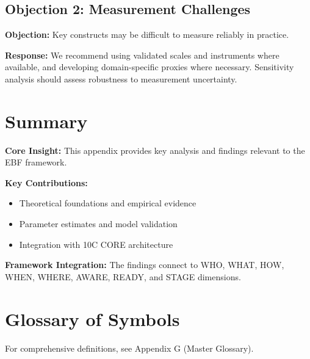 \subsection{Objection 2: Measurement Challenges}

\textbf{Objection:} Key constructs may be difficult to measure reliably in
practice.

\textbf{Response:} We recommend using validated scales and instruments where
available, and developing domain-specific proxies where necessary. Sensitivity
analysis should assess robustness to measurement uncertainty.





\section{Summary}
\label{sec:llm-summary}

\begin{tcolorbox}[colback=gray!5!white, colframe=gray!75!black,
    title=Appendix UNMAPPED_LLM Summary]

\textbf{Core Insight:}
This appendix provides key analysis and findings relevant to the EBF framework.

\textbf{Key Contributions:}
\begin{itemize}[nosep]
    \item Theoretical foundations and empirical evidence
    \item Parameter estimates and model validation
    \item Integration with 10C CORE architecture
\end{itemize}

\textbf{Framework Integration:}
The findings connect to WHO, WHAT, HOW, WHEN, WHERE, AWARE, READY, and STAGE dimensions.

\end{tcolorbox}

\section{Glossary of Symbols}
\label{sec:llm-glossary}

For comprehensive definitions, see Appendix G (Master Glossary).

